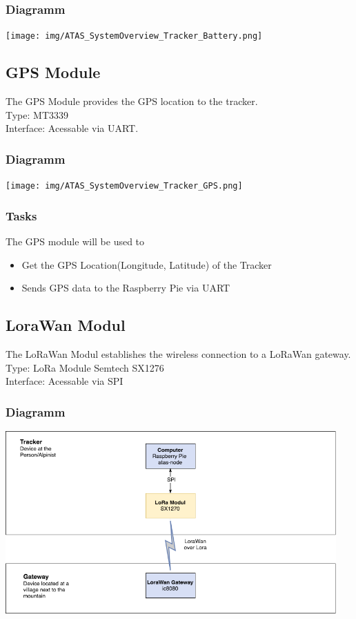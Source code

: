 \documentclass[a4paper,11pt, oneside]{report}
\theoremstyle{definition}
\begin{document}
\subsubsection{Diagramm}
\texttt{[image: img/ATAS\_SystemOverview\_Tracker\_Battery.png]}

\subsection{GPS Module}
The GPS Module provides the GPS location to the tracker.\\[0.3cm]
Type: MT3339\\
Interface:  Acessable via UART.
\subsubsection{Diagramm}
\texttt{[image: img/ATAS\_SystemOverview\_Tracker\_GPS.png]}
\subsubsection{Tasks}
The GPS module will be used to
\begin{itemize}
\item Get the GPS Location(Longitude, Latitude) of the Tracker
\item Sends GPS data to the Raspberry Pie via UART
\end{itemize}


\subsection{LoraWan Modul}
The LoRaWan Modul establishes the wireless connection to a LoRaWan gateway.\\[0.3cm]
Type: LoRa Module Semtech SX1276\\
Interface: Acessable via SPI
\subsubsection{Diagramm}
\includegraphics[width=0.95\textwidth]{img/ATAS_SystemOverview_Detail_LoRaWan.png}
\end{document}
